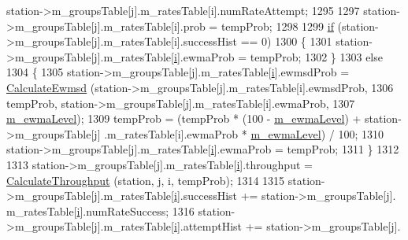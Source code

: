 \begin{DoxyCode}
      station->m\_groupsTable[j].m\_ratesTable[i].numRateAttempt;
1295 
1297                       station->m\_groupsTable[j].m\_ratesTable[i].prob = tempProb;
1298 
1299                       \hyperlink{loss__ITU1238_8m_a419d895abe1313c35fa353c93802647e}{if} (station->m\_groupsTable[j].m\_ratesTable[i].successHist == 0)
1300                         \{
1301                           station->m\_groupsTable[j].m\_ratesTable[\hyperlink{bernuolliDistribution_8m_a6f6ccfcf58b31cb6412107d9d5281426}{i}].ewmaProb = tempProb;
1302                         \}
1303                       \textcolor{keywordflow}{else}
1304                         \{
1305                           station->m\_groupsTable[j].m\_ratesTable[\hyperlink{bernuolliDistribution_8m_a6f6ccfcf58b31cb6412107d9d5281426}{i}].ewmsdProb = 
      \hyperlink{classns3_1_1MinstrelHtWifiManager_a68fa27a1e0e083f4d3f2e19db64c1d4e}{CalculateEwmsd} (station->m\_groupsTable[j].m\_ratesTable[i].ewmsdProb,
1306                                                                                                 tempProb, 
      station->m\_groupsTable[j].m\_ratesTable[i].ewmaProb,
1307                                                                                                 
      \hyperlink{classns3_1_1MinstrelHtWifiManager_ace0a340f6c702f416f3dc9fed71105d1}{m\_ewmaLevel});
1309                           tempProb = (tempProb * (100 - \hyperlink{classns3_1_1MinstrelHtWifiManager_ace0a340f6c702f416f3dc9fed71105d1}{m\_ewmaLevel}) + station->m\_groupsTable[j]
      .m\_ratesTable[i].ewmaProb * \hyperlink{classns3_1_1MinstrelHtWifiManager_ace0a340f6c702f416f3dc9fed71105d1}{m\_ewmaLevel})  / 100;
1310                           station->m\_groupsTable[j].m\_ratesTable[\hyperlink{bernuolliDistribution_8m_a6f6ccfcf58b31cb6412107d9d5281426}{i}].ewmaProb = tempProb;
1311                         \}
1312 
1313                       station->m\_groupsTable[j].m\_ratesTable[\hyperlink{bernuolliDistribution_8m_a6f6ccfcf58b31cb6412107d9d5281426}{i}].throughput = 
      \hyperlink{classns3_1_1MinstrelHtWifiManager_aedf901def4f23eac093a7da8f363170b}{CalculateThroughput} (station, j, i, tempProb);
1314 
1315                       station->m\_groupsTable[j].m\_ratesTable[\hyperlink{bernuolliDistribution_8m_a6f6ccfcf58b31cb6412107d9d5281426}{i}].successHist += station->m\_groupsTable[j].
      m\_ratesTable[\hyperlink{bernuolliDistribution_8m_a6f6ccfcf58b31cb6412107d9d5281426}{i}].numRateSuccess;
1316                       station->m\_groupsTable[j].m\_ratesTable[\hyperlink{bernuolliDistribution_8m_a6f6ccfcf58b31cb6412107d9d5281426}{i}].attemptHist += station->m\_groupsTable[j].

\end{DoxyCode}
